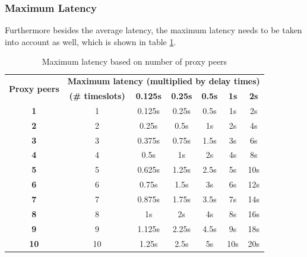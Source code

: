\subsubsection{Maximum Latency}
Furthermore besides the average latency, the maximum latency needs
to be taken into account as well, which is shown in table \ref{maxlatencypeers}.
\begin{longtable}{|c|c|c|c|c|c|c|}
\caption{Maximum latency based on number of proxy peers}
\label{maxlatencypeers}\\
\hline
\multirow{2}{*}{\textbf{Proxy peers}} & \multicolumn{6}{|l|}{\textbf{Maximum latency (multiplied by delay times)}} \\
& \textbf{(\# timeslots)} & \textbf{0.125s} & \textbf{0.25s} & \textbf{0.5s} & \textbf{1s} & \textbf{2s}\\
\hline
\textbf{1} & 1 & 0.125s & 0.25s & 0.5s & 1s & 2s\\
\hline
\textbf{2} & 2 & 0.25s & 0.5s & 1s & 2s & 4s\\
\hline
\textbf{3} & 3 & 0.375s & 0.75s & 1.5s & 3s & 6s\\
\hline
\textbf{4} & 4 & 0.5s & 1s & 2s & 4s & 8s\\
\hline
\textbf{5} & 5 & 0.625s & 1.25s & 2.5s & 5s & 10s\\
\hline
\textbf{6} & 6 & 0.75s & 1.5s & 3s & 6s & 12s\\
\hline
\textbf{7} & 7 & 0.875s & 1.75s & 3.5s & 7s & 14s\\
\hline
\textbf{8} & 8 & 1s & 2s & 4s & 8s & 16s\\
\hline
\textbf{9} & 9 & 1.125s & 2.25s & 4.5s & 9s & 18s\\
\hline
\textbf{10} & 10 & 1.25s & 2.5s & 5s & 10s & 20s\\
\hline
\end{longtable}
